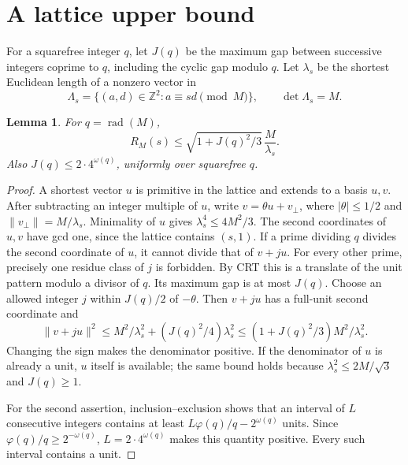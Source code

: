 \documentclass[11pt]{article}
\newtheorem{lemma}[theorem]{Lemma}
\theoremstyle{definition}\newtheorem{definition}[theorem]{Definition}
\theoremstyle{remark}\newtheorem{remark}[theorem]{Remark}
\newcommand{\Z}{\mathbb Z}
\newcommand{\rad}{\operatorname{rad}}
\begin{document}
\section{A lattice upper bound}
For a squarefree integer \(q\), let \(J(q)\) be the maximum gap between
successive integers coprime to \(q\), including the cyclic gap modulo \(q\).
Let \(\lambda_s\) be the shortest Euclidean length of a nonzero vector in
\[
 \Lambda_s=\{(a,d)\in\Z^2:a\equiv sd\pmod M\},
 \qquad \det\Lambda_s=M.
\]

\begin{lemma}\label{lem:wheel}
For \(q=\rad(M)\),
\[
 R_M(s)\le\sqrt{1+J(q)^2/3}\,\frac M{\lambda_s}.
\]
Also \(J(q)\le2\cdot4^{\omega(q)}\), uniformly over squarefree \(q\).
\end{lemma}
\begin{proof}
A shortest vector \(u\) is primitive in the lattice and extends to a
basis \(u,v\). After subtracting an integer multiple of \(u\), write
\(v=\theta u+v_\perp\), where \(|\theta|\le1/2\) and
\(\|v_\perp\|=M/\lambda_s\). Minimality of \(u\) gives
\(\lambda_s^4\le4M^2/3\).
The second coordinates of \(u,v\) have gcd one, since the lattice contains
\((s,1)\). If a prime dividing \(q\) divides the second coordinate of \(u\),
it cannot divide that of \(v+ju\). For every other prime, precisely one
residue class of \(j\) is forbidden. By CRT this is a translate of the
unit pattern modulo a divisor of \(q\). Its maximum gap is at most \(J(q)\).
Choose an allowed integer \(j\) within \(J(q)/2\) of \(-\theta\).
Then \(v+ju\) has a full-unit second coordinate and
\[
 \|v+ju\|^2\le M^2/\lambda_s^2+(J(q)^2/4)\lambda_s^2
 \le (1+J(q)^2/3)M^2/\lambda_s^2.
\]
Changing the sign makes the denominator positive.
If the denominator of \(u\) is already a unit, \(u\) itself is available;
the same bound holds because
\(\lambda_s^2\le2M/\sqrt3\) and \(J(q)\ge1\).

For the second assertion, inclusion--exclusion shows that an interval of
\(L\) consecutive integers contains at least
\(L\varphi(q)/q-2^{\omega(q)}\) units. Since
\(\varphi(q)/q\ge2^{-\omega(q)}\), \(L=2\cdot4^{\omega(q)}\)
makes this quantity positive. Every such interval contains a unit.
\end{proof}
\end{document}
